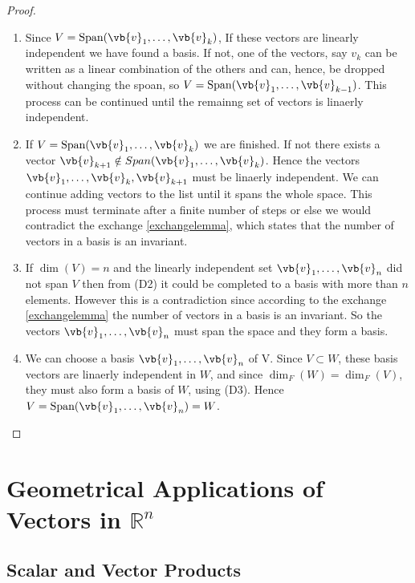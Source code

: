 \documentclass[a4paper,12pt]{report}
\begin{document}
\begin{proof}

\begin{enumerate}[label=(\(D\)\arabic*)] 
    \item Since \(V = \text{Span}(\vb{v}_{1}, \ldots, \vb{v}_k ) \), If these vectors are linearly independent we have found a basis. If not, one of the vectors, say \(v_{k} \) can be written as a linear combination of the others and can, hence, be dropped without changing the spoan, so \(V = \text{Span}(\vb{v}_{1}, \ldots, \vb{v}_{k-1}) \). This process can be continued until the remainng set of vectors is linaerly independent.
    \item If \(V= \text{Span}(\vb{v}_{1}, \ldots, \vb{v}_k) \) we are finished. If not there exists a vector \(\vb{v} _{k+1} \notin Span(\vb{v}_{1}, \ldots, \vb{v}_k) \). Hence the vectors \(\vb{v}_{1}, \ldots, \vb{v}_k, \vb{v} _{k+1} \) must be linaerly independent. We can continue adding vectors to the list until it spans the whole space. This process must terminate after a finite number of steps or else we would contradict the exchange \cref{exchangelemma}, which states that the number of vectors in a basis is an invariant.
    \item If \(\dim (V) = n\) and the linearly independent set \(\vb{v}_{1}, \ldots, \vb{v}_n \) did not span \(V\) then from (D2) it could be completed to a basis with more than \(n\) elements. However this is a contradiction since according to the exchange \cref{exchangelemma} the number of vectors in a basis is an invariant. So the vectors \(\vb{v}_{1}, \ldots, \vb{v}_n \) must span the space and they form a basis.
    \item We can choose a basis \(\vb{v}_{1}, \ldots, \vb{v}_n \) of V. Since \(V \subset W\), these basis vectors are linaerly independent in \(W\), and since \(\dim _{F} (W) = \dim _{F} (V)  \), they must also form a basis of \(W\), using (D3). Hence \(V = \text{Span}(\vb{v}_{1}, \ldots, \vb{v}_n ) = W \).         
\end{enumerate}

\end{proof}


\chapter{Geometrical Applications of Vectors in \(\mathbb{R}^{n} \)}

\section{Scalar and Vector Products}
\end{document}
